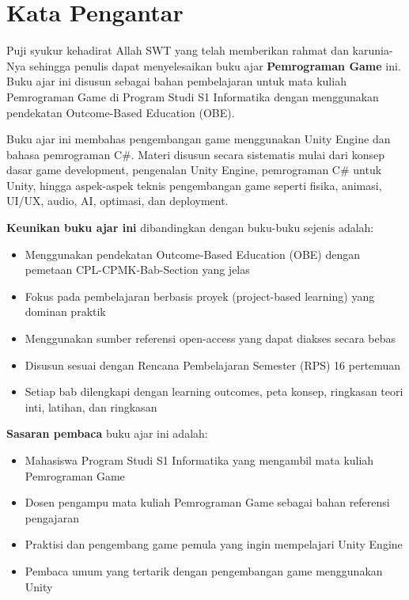
\chapter*{Kata Pengantar}

\vspace{0.5cm}

Puji syukur kehadirat Allah SWT yang telah memberikan rahmat dan karunia-Nya sehingga penulis dapat menyelesaikan buku ajar \textbf{Pemrograman Game} ini. Buku ajar ini disusun sebagai bahan pembelajaran untuk mata kuliah Pemrograman Game di Program Studi S1 Informatika dengan menggunakan pendekatan Outcome-Based Education (OBE).

Buku ajar ini membahas pengembangan game menggunakan Unity Engine dan bahasa pemrograman C\#. Materi disusun secara sistematis mulai dari konsep dasar game development, pengenalan Unity Engine, pemrograman C\# untuk Unity, hingga aspek-aspek teknis pengembangan game seperti fisika, animasi, UI/UX, audio, AI, optimasi, dan deployment.

\textbf{Keunikan buku ajar ini} dibandingkan dengan buku-buku sejenis adalah:
\begin{itemize}
\item Menggunakan pendekatan Outcome-Based Education (OBE) dengan pemetaan CPL-CPMK-Bab-Section yang jelas
\item Fokus pada pembelajaran berbasis proyek (project-based learning) yang dominan praktik
\item Menggunakan sumber referensi open-access yang dapat diakses secara bebas
\item Disusun sesuai dengan Rencana Pembelajaran Semester (RPS) 16 pertemuan
\item Setiap bab dilengkapi dengan learning outcomes, peta konsep, ringkasan teori inti, latihan, dan ringkasan
\end{itemize}

\textbf{Sasaran pembaca} buku ajar ini adalah:
\begin{itemize}
\item Mahasiswa Program Studi S1 Informatika yang mengambil mata kuliah Pemrograman Game
\item Dosen pengampu mata kuliah Pemrograman Game sebagai bahan referensi pengajaran
\item Praktisi dan pengembang game pemula yang ingin mempelajari Unity Engine
\item Pembaca umum yang tertarik dengan pengembangan game menggunakan Unity
\end{itemize}

